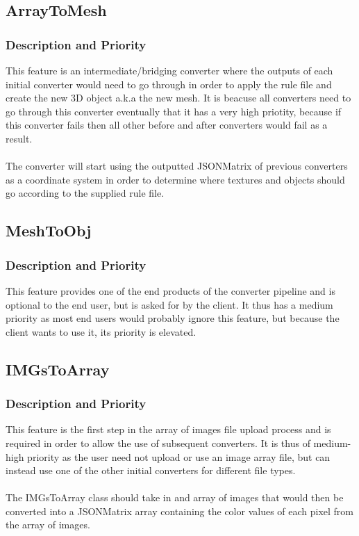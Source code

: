 \documentclass[english]{article}
\begin{document}
	\pagebreak
		\subsection{ArrayToMesh}
		\subsubsection{Description and Priority}
		This feature is an intermediate/bridging converter where the outputs of each initial converter would need to go through in order to apply the rule file and create the new 3D object a.k.a the new mesh. It is beacuse all converters need to go through this converter eventually that it has a very high priotity, because if this converter fails then all other before and after converters would fail as a result.\\\\
		The converter will start using the outputted JSONMatrix of previous converters as a coordinate system in order to determine where textures and objects should go according to the supplied rule file. 
		
	\pagebreak
	\subsection{MeshToObj}
	\subsubsection{Description and Priority}
	This feature provides one of the end products of the converter pipeline and is optional to the end user, but is asked for by the client. It thus has a medium priority as most end users would probably ignore this feature, but because the client wants to use it, its priority is elevated.
	
	\pagebreak
	\subsection{IMGsToArray}
	\subsubsection{Description and Priority}
	This feature is the first step in the array of images file upload process and is required in order to allow the use of subsequent converters. It is thus of medium-high priority as the user need not upload or use an image array file, but can instead use one of the other initial converters for different file types.\\\\
	The IMGsToArray class should take in and array of images that would then be converted into a JSONMatrix array containing the color values of each pixel from the array of images.
	
\end{document}
